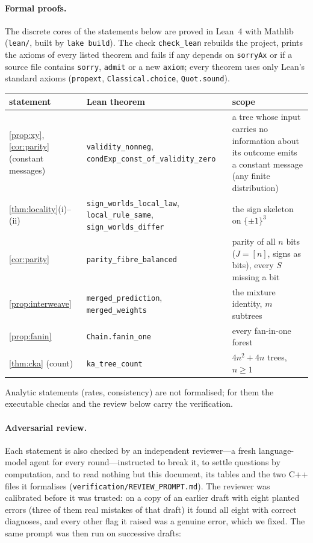 \documentclass[11pt]{article}
\theoremstyle{definition}
\theoremstyle{remark}
\begin{document}

\paragraph{Formal proofs.}
The discrete cores of the statements below are proved in Lean~4 with Mathlib
\citep{moura2021lean4,mathlib2020} (\texttt{lean/}, built by \texttt{lake build}).  The
check \texttt{check\_lean} rebuilds the project, prints the axioms of every listed theorem and
fails if any depends on \texttt{sorryAx} or if a source file contains \texttt{sorry},
\texttt{admit} or a new \texttt{axiom}; every theorem uses only Lean's standard axioms
(\texttt{propext}, \texttt{Classical.choice}, \texttt{Quot.sound}).
\begin{center}\small
\begin{tabular}{@{}p{3.3cm}p{5.4cm}p{6.4cm}@{}}\toprule
statement & Lean theorem & scope\\\midrule
\cref{prop:xy}, \cref{cor:parity} (constant messages) & \texttt{validity\_nonneg}, \texttt{condExp\_const\_of\_validity\_zero} & a tree whose input carries no information about its outcome emits a constant message (any finite distribution)\\
\cref{thm:locality}(i)--(ii) & \texttt{sign\_worlds\_local\_law}, \texttt{local\_rule\_same}, \texttt{sign\_worlds\_differ} & the sign skeleton on $\{\pm1\}^3$\\
\cref{cor:parity} & \texttt{parity\_fibre\_balanced} & parity of all $n$ bits ($J=[n]$, signs as bits), every $S$ missing a bit\\
\cref{prop:interweave} & \texttt{merged\_prediction}, \texttt{merged\_weights} & the mixture identity, $m$ subtrees\\
\cref{prop:fanin} & \texttt{Chain.fanin\_one} & every fan-in-one forest\\
\cref{thm:cka} (count) & \texttt{ka\_tree\_count} & $4n^2+4n$ trees, $n\ge1$\\
\bottomrule
\end{tabular}
\end{center}
Analytic statements (rates, consistency) are not formalised; for them the executable
checks and the review below carry the verification.

\paragraph{Adversarial review.}
Each statement is also checked by an independent reviewer---a fresh language-model agent
for every round---instructed to break it, to settle questions by computation, and to
read nothing but this document, its tables and the two C++ files it formalises
(\nolinkurl{verification/REVIEW_PROMPT.md}).  The reviewer was calibrated before it was
trusted: on a copy of an earlier draft with eight planted errors (three of them real
mistakes of that draft) it found all eight with correct diagnoses, and every other flag it
raised was a genuine error, which we fixed.  The same prompt was then run on successive
drafts:
\end{document}
